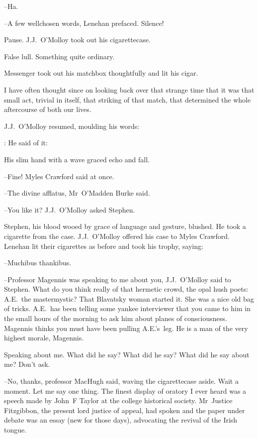 --Ha.

--A few wellchosen words,
Lenehan prefaced.
Silence!

Pause.
J.J.~O'Molloy took out his cigarettecase.

False lull.
Something quite ordinary.

Messenger took out his matchbox thoughtfully and lit his cigar.

I have often thought since
on looking back over that strange time
that it was that small act,
trivial in itself,
that striking of that match,
that determined the whole aftercourse of both our lives.



J.J.~O'Molloy resumed,
moulding his words:

\jjom:
He said of it:

His slim hand with a wave graced echo and fall.

--Fine!
Myles Crawford said at once.

--The divine afflatus,
Mr~O'Madden Burke said.

--You like it?
J.J.~O'Molloy asked Stephen.

Stephen,
his blood wooed by grace of language and gesture,
blushed.
He took a cigarette from the case.
J.J.~O'Molloy offered his case to Myles Crawford.
Lenehan lit their cigarettes as before
and took his trophy,
saying:

--Muchibus thankibus.



--Professor Magennis was speaking to me about you,
J.J.~O'Molloy said to Stephen.
What do you think really of that hermetic crowd,
the opal hush poets:
A.E.~the mastermystic?
That Blavatsky woman started it.
She was a nice old bag of tricks.
A.E.~has been telling some yankee interviewer
that you came to him in the small hours of the morning
to ask him about planes of consciousness.
Magennis thinks you must have been pulling A.E.'s~leg.
He is a man of the very highest morale,
Magennis.

Speaking about me.
What did he say?
What did he say?
What did he say about me?
Don't ask.

--No, thanks,
professor MacHugh said,
waving the cigarettecase aside.
Wait a moment.
Let me say one thing.
The finest display of oratory I ever heard
was a speech made by John~F Taylor at the college historical society.
Mr~Justice Fitzgibbon,
the present lord justice of appeal,
had spoken
and the paper under debate was an essay (new for those days),
advocating the revival of the Irish tongue.

